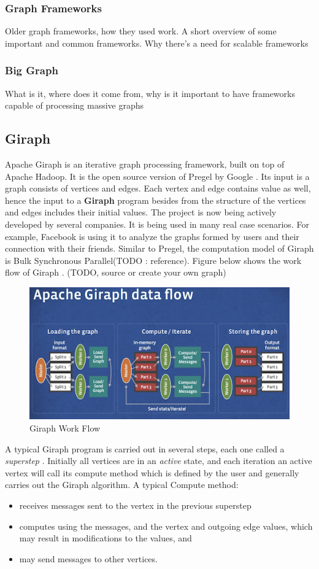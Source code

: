 \documentclass[english]{tktltiki}
\begin{document}
\subsubsection{Graph Frameworks}
Older graph frameworks, how they used work. A short overview of some important and common frameworks. Why there's a need for scalable frameworks

\subsubsection{Big Graph}
What is it, where does it come from, why is it important to have frameworks capable of processing massive graphs

\subsection{Giraph}
Apache Giraph is an iterative graph processing framework, built on top of Apache Hadoop. It is the open source version of Pregel by Google \cite{malewicz10} . Its input is a graph consists of vertices and edges. Each vertex and edge contains value as well, hence the input to a \textbf{Giraph} program besides from the structure of the vertices and edges includes their initial values. The project is now being actively developed by several companies. It is being used in many real case scenarios. For example, Facebook is using it to analyze the graphs formed by users and their connection with their friends. Similar to Pregel, the computation model of Giraph is Bulk Synchronous Parallel(TODO : reference). 
Figure below shows the work flow of Giraph . (TODO, source or create your own graph)
\begin{figure}[ht!]
\centering
\includegraphics[width=130mm]{figures/giraphdataflow.png}
\caption{Giraph Work Flow}
\end{figure}
A typical Giraph program is carried out in several steps, each one called a \textit{superstep} . Initially all vertices are in an \textit{active} state, and each iteration an active vertex will call its compute method which is defined by the user and generally carries out the Giraph algorithm. A typical Compute method:
\begin{itemize}
\item
receives messages sent to the vertex in the previous superstep
\item
computes using the messages, and the vertex and outgoing edge values, which may result in modifications to the values, and
\item
may send messages to other vertices.
\end{itemize}
\end{document}
